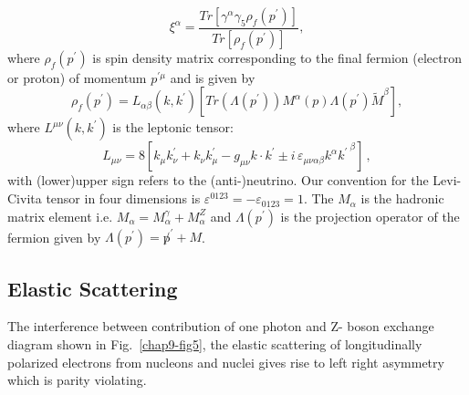 \begin{equation}
\xi^\alpha =\frac{Tr[\gamma^\alpha \gamma_5\rho_f(p^\prime)]}{Tr[ \rho_f(p^\prime)] } , \label{chap9-eq14}
\end{equation}
where $\rho_f(p^\prime)$ is spin density matrix  corresponding to the final fermion (electron or proton) of momentum $p^{\prime\mu}$ and is given by 
\begin{equation}
\rho_f(p^\prime)= L_{ \alpha \beta}(k,k^\prime)[Tr(\Lambda(p^\prime) )M^\alpha(p)\Lambda(p^\prime)\tilde{M}^\beta] , \label{chap9-eq15}
\end{equation}
where $L^{\mu \nu}(k,k^\prime)$ is the leptonic tensor: 
\begin{equation}
    L_{\mu \nu}= 8 \left[  k_\mu  k^\prime_\nu  +  k_\nu  k^\prime_\mu  - g_{\mu \nu} k \cdot k^\prime 
    \pm  i \, \varepsilon_{\mu \nu \alpha \beta} k^\alpha {k^\prime \,}^\beta \right] \, , \label{chap9-eq16}
\end{equation}
with (lower)upper sign refers to the (anti-)neutrino. Our convention for the Levi-Civita tensor in four dimensions is 
$\varepsilon^{0123}=-\varepsilon_{0123}=1$. The $M_\alpha$ is the hadronic matrix element i.e. $M_\alpha=M_\alpha^\gamma+ M_\alpha^Z$ and $\Lambda(p^\prime)$ is the projection operator of the fermion given by $\Lambda(p^\prime)={\not p^{\prime}}+M$.

\subsection{Elastic Scattering}\label{chap9-subsec3.1}

The interference between contribution of one photon and Z- boson  exchange diagram shown in Fig.~\ref{chap9-fig5}, the elastic scattering of longitudinally polarized electrons from nucleons and nuclei gives rise to left right asymmetry which is parity violating. 


